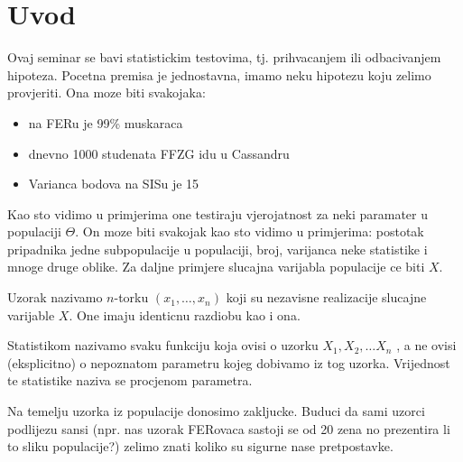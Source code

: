 \chapter{Uvod}
\label{Chapter1}

Ovaj seminar se bavi statistickim testovima, tj. prihvacanjem ili odbacivanjem hipoteza.
Pocetna premisa je jednostavna, imamo neku hipotezu koju zelimo provjeriti. Ona moze biti svakojaka:

\begin{itemize}
	\item na FERu je 99\% muskaraca 
	\item dnevno 1000 studenata FFZG idu u Cassandru
	\item Varianca bodova na SISu je 15
\end{itemize}

Kao sto vidimo u primjerima one testiraju vjerojatnost za neki paramater u populaciji $\Theta$. On moze biti svakojak kao sto vidimo u primjerima: postotak pripadnika jedne subpopulacije u populaciji, broj, varijanca neke statistike i mnoge druge oblike. Za daljne primjere slucajna varijabla populacije ce biti $X$.

Uzorak nazivamo $n$-torku $(x_1, \ldots, x_n)$ koji su nezavisne realizacije slucajne varijable $X$. One imaju identicnu razdiobu kao i ona.\cite{vis3}

Statistikom nazivamo svaku funkciju koja ovisi o uzorku $X_1 , X_2 , \ldots X_n$ , a ne ovisi (eksplicitno) o nepoznatom parametru kojeg dobivamo iz tog uzorka. \cite{vis3} Vrijednost te statistike naziva se procjenom parametra. \cite{vis3}

Na temelju uzorka iz populacije donosimo zakljucke. Buduci da sami uzorci podlijezu sansi (npr. nas uzorak FERovaca sastoji se od 20 zena no prezentira li to sliku populacije?) zelimo znati koliko su sigurne nase pretpostavke. 

